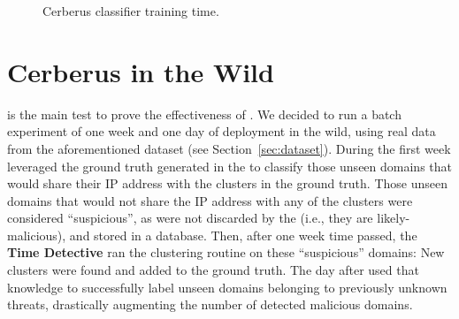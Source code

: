\begin{figure}[!htp]
\caption{Cerberus classifier training time.}
\label{fig:cerberus_training_time}
\end{figure}
\section{Cerberus in the Wild} %
\label{sec:cerberus_in_the_wild}
 is the main test to prove the effectiveness of \thesystem.
We decided to run a batch experiment of
one week and one day of deployment in the wild, using real data from the aforementioned dataset (see Section~\ref{sec:dataset}). During the first week \thesystem
leveraged the ground truth generated in the  to classify those unseen domains that would share their IP address with the clusters
in the ground truth. Those unseen domains that would not share the IP address with any of the clusters were considered ``suspicious'', as were not discarded by the  (i.e., they are likely-malicious), and stored in a database. Then, after one week time passed, the \textbf{Time Detective} ran the
clustering routine on these ``suspicious'' domains: New clusters were found and added to the ground truth. The day
after \thesystem used that knowledge to
successfully label unseen domains belonging to previously unknown threats, drastically
augmenting the number of detected malicious domains.
